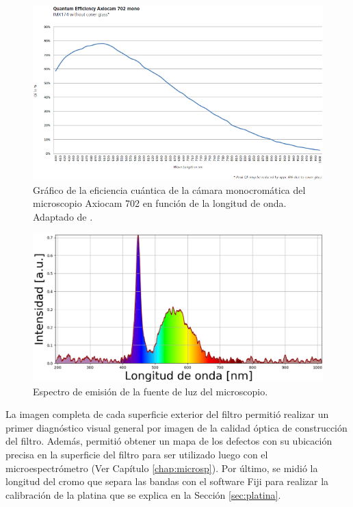 \begin{figure}[H]
	\centering
	\includegraphics[width=1.0\textwidth]{Figs/defectosZEISS/eficienciacuanticacamarazeiss.png}
	\caption{Gráfico de la eficiencia cuántica de la cámara monocromática del microscopio Axiocam 702 en función de la longitud de onda. Adaptado de \cite{axiozeiss}.}
	\label{fig:eficienciacuanticamara}
\end{figure}

\begin{figure}[H]
	\centering
	\includegraphics[width=1.0\textwidth]{Figs/defectosZEISS/espectrolampZEISS.png}
	\caption{Espectro de emisión de la fuente de luz del microscopio.}
	\label{fig:espectrolamparazeiss}
\end{figure}


La imagen completa de cada superficie exterior del filtro permitió realizar un primer diagnóstico visual general por imagen de la calidad óptica de construcción del filtro. Además, permitió obtener un mapa de los defectos con su ubicación precisa en la superficie del filtro para ser utilizado luego con el microespectrómetro (Ver Capítulo \ref{chap:microsp}). Por último, se midió la longitud del cromo que separa las bandas con el software Fiji para realizar la calibración de la platina que se explica en la Sección \ref{sec:platina}.

